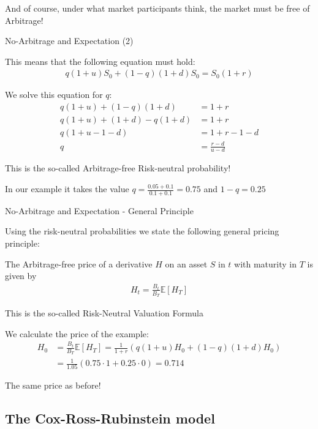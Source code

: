 	And of course, under what market participants think, the market must be free of Arbitrage!


{No-Arbitrage and Expectation (2)}


	This means that the following equation must hold:
  \begin{align*}
    q (1+u) S_0 + (1-q) (1+d) S_0 = S_0 (1+r)
  \end{align*}

	We solve this equation for $q$:
  \begin{align*}
    q (1+u) + (1-q) (1+d) & = 1+r \\
    q (1+u) + (1+d) -q (1+d) & = 1+r \\
    q (1+u - 1 -d) & = 1+r -1 - d\\
    q & = \frac{r-d}{u-d}
  \end{align*}

	This is the so-called Arbitrage-free Risk-neutral probability!

	In our example it takes the value $q = \frac{0.05 + 0.1}{0.1 + 0.1} = 0.75$ and $1-q=0.25$


{No-Arbitrage and Expectation - General Principle}


	Using the risk-neutral probabilities we state the following general pricing principle:

	The Arbitrage-free price of a derivative $H$ on an asset $S$ in $t$ with maturity in $T$ is given by
  \begin{align*}
    H_t = \frac{B_t}{B_T} \mathbb{E}[H_T]
  \end{align*}

	This is the so-called Risk-Neutral Valuation Formula
  \vspace{0.3cm}

	We calculate the price of the example:
  \begin{align*}
    H_0 & = \frac{B_t}{B_T} \mathbb{E}[H_T] = \frac{1}{1+r} (q (1+u) H_0 + (1-q) (1+d) H_0) \\
    & = \frac{1}{1.05} (0.75 \cdot 1 + 0.25 \cdot 0) = 0.714
  \end{align*}

	The same price as before!


\subsection{The Cox-Ross-Rubinstein model}
